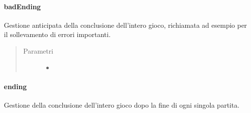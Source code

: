 \documentclass[letterpaper,10pt,italian]{sphinxmanual}
\begin{document}
\paragraph{badEnding}
\label{\detokenize{source/it/unicam/cs/pa/mastermind/ui/StartView:badending}}

\begin{fulllineitems}
\label{\detokenize{source/it/unicam/cs/pa/mastermind/ui/StartView:it.unicam.cs.pa.mastermind.ui.StartView.badEnding(String)}}
Gestione anticipata della conclusione dell’intero gioco, richiamata ad esempio per il sollevamento di errori importanti.
\begin{quote}\begin{description}
\item[{Parametri}] \leavevmode\begin{itemize}
\item {} 
 \textendash{} 

\end{itemize}

\end{description}\end{quote}

\end{fulllineitems}



\paragraph{ending}
\label{\detokenize{source/it/unicam/cs/pa/mastermind/ui/StartView:ending}}

\begin{fulllineitems}
\label{\detokenize{source/it/unicam/cs/pa/mastermind/ui/StartView:it.unicam.cs.pa.mastermind.ui.StartView.ending()}}
Gestione della conclusione dell’intero gioco dopo la fine di ogni singola partita.

\end{fulllineitems}
\end{document}
